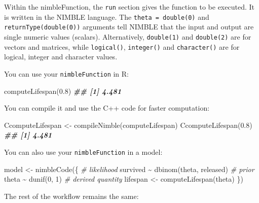 \documentclass[
  12pt,
]{krantz}
\newenvironment{Shaded}{\begin{snugshade}}{\end{snugshade}}
\newcommand{\CommentTok}[1]{\textcolor[rgb]{0.56,0.35,0.01}{\textit{#1}}}
\newcommand{\DecValTok}[1]{\textcolor[rgb]{0.00,0.00,0.81}{#1}}
\newcommand{\DocumentationTok}[1]{\textcolor[rgb]{0.56,0.35,0.01}{\textbf{\textit{#1}}}}
\newcommand{\FloatTok}[1]{\textcolor[rgb]{0.00,0.00,0.81}{#1}}
\newcommand{\FunctionTok}[1]{\textcolor[rgb]{0.00,0.00,0.00}{#1}}
\newcommand{\NormalTok}[1]{#1}
\newcommand{\OtherTok}[1]{\textcolor[rgb]{0.56,0.35,0.01}{#1}}
\newcommand{\SpecialCharTok}[1]{\textcolor[rgb]{0.00,0.00,0.00}{#1}}
\begin{document}
Within the nimbleFunction, the \texttt{run} section gives the function to be executed. It is written in the NIMBLE language. The \texttt{theta\ =\ double(0)} and \texttt{returnType(double(0))} arguments tell NIMBLE that the input and output are single numeric values (scalars). Alternatively, \texttt{double(1)} and \texttt{double(2)} are for vectors and matrices, while \texttt{logical()}, \texttt{integer()} and \texttt{character()} are for logical, integer and character values.

You can use your \texttt{nimbleFunction} in R:

\begin{Shaded}
\begin{Highlighting}[]
\FunctionTok{computeLifespan}\NormalTok{(}\FloatTok{0.8}\NormalTok{)}
\DocumentationTok{\#\# [1] 4.481}
\end{Highlighting}
\end{Shaded}

You can compile it and use the C++ code for faster computation:

\begin{Shaded}
\begin{Highlighting}[]
\NormalTok{CcomputeLifespan }\OtherTok{\textless{}{-}} \FunctionTok{compileNimble}\NormalTok{(computeLifespan)}
\FunctionTok{CcomputeLifespan}\NormalTok{(}\FloatTok{0.8}\NormalTok{)}
\DocumentationTok{\#\# [1] 4.481}
\end{Highlighting}
\end{Shaded}

You can also use your \texttt{nimbleFunction} in a model:

\begin{Shaded}
\begin{Highlighting}[]
\NormalTok{model }\OtherTok{\textless{}{-}} \FunctionTok{nimbleCode}\NormalTok{(\{}
  \CommentTok{\# likelihood}
\NormalTok{  survived }\SpecialCharTok{\textasciitilde{}} \FunctionTok{dbinom}\NormalTok{(theta, released)}
  \CommentTok{\# prior}
\NormalTok{  theta }\SpecialCharTok{\textasciitilde{}} \FunctionTok{dunif}\NormalTok{(}\DecValTok{0}\NormalTok{, }\DecValTok{1}\NormalTok{)}
  \CommentTok{\# derived quantity}
\NormalTok{  lifespan }\OtherTok{\textless{}{-}} \FunctionTok{computeLifespan}\NormalTok{(theta)}
\NormalTok{\})}
\end{Highlighting}
\end{Shaded}

The rest of the workflow remains the same:
\end{document}
